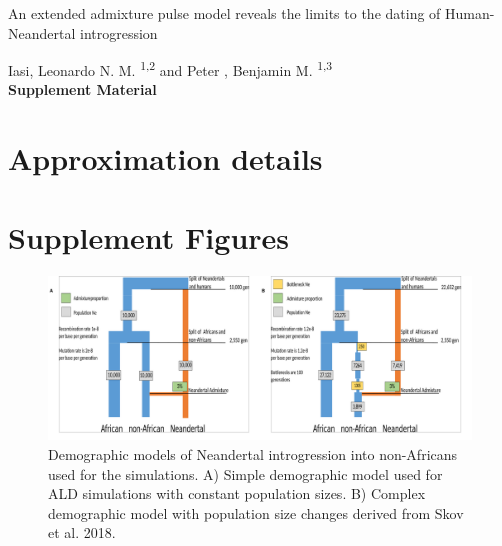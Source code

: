 \documentclass[11pt]{article}
\begin{document}
\begin{titlepage}


    \vspace*{1cm}
        
        
    \begin{center}       
        \large
        \vspace{1cm}
        An extended admixture pulse model reveals the limits to the dating of Human-Neandertal introgression
        
       \vspace{1.0cm}
        \large
        Iasi, Leonardo N. M. \textsuperscript{1,2} and Peter , Benjamin M. \textsuperscript{1,3} \\ 
        
        \vspace{1.0cm}
            \Huge
            \textbf{Supplement Material}
    \end{center} 

            

\end{titlepage}
\section{Approximation details}

\hypertarget{refs}{}


\section{Supplement Figures}

\begin{figure}
\centering
\includegraphics{Admixture_Time_Inference_Paper_Draft_files/figure-latex/Simple_and_Skov.pdf}
\caption{\label{fig:figS1} Demographic models of Neandertal introgression into non-Africans used for the simulations. A) Simple demographic model used for ALD simulations with constant population sizes. B) Complex demographic model with population size changes derived from Skov et al. 2018.}
\end{figure}
\end{document}
